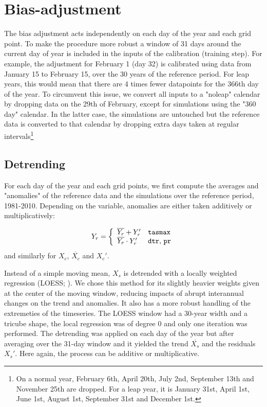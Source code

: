 \documentclass[letterpaper,10pt]{article}
\begin{document}
\section{Bias-adjustment}
The bias adjustment acts independently on each day of the year and each grid point.
To make the procedure more robust a window of 31 days around the current day of year is included in the inputs of the calibration (training step).
For example, the adjustment for February 1 (day 32) is calibrated using data from January 15 to February 15, over the 30 years of the reference period. 
For leap years, this would mean that there are 4 times fewer datapoints for the 366th day of the year.
To circumvent this issue, we convert all inputs to a "noleap" calendar by dropping data on the 29th of February, except for simulations using the "360 day" calendar.
In the latter case, the simulations are untouched but the reference data is converted to that calendar by dropping extra days taken at regular intervals\footnote{On a normal year, February 6th, April 20th, July 2nd, September 13th and November 25th are dropped. For a leap year, it is January 31st, April 1st, June 1st, August 1st, September 31st and December 1st.}

\subsection{Detrending}
For each day of the year and each grid points, we first compute the averages and "anomalies" of the reference data and the simulations over the reference period, 1981-2010. Depending on the variable, anomalies are either taken additively or multiplicatively:

\begin{align}
Y_r = \left\{ \begin{array}{ll} \overline{Y_r} + Y_r' & \text{\texttt{tasmax}} \\ \overline{Y_r}\cdot Y_r' & \text{\texttt{dtr}, \texttt{pr}} \end{array}\right.
\end{align}
and similarly for $X_c$, $\overline{X_c}$ and $X_c'$.

Instead of a simple moving mean, $X_s$ is detrended with a locally weighted regression (LOESS; \cite{Cleveland79}).
We chose this method for its slightly heavier weights given at the center of the moving window, reducing impacts of abrupt interannual changes on the trend and anomalies. It also has a more robust handling of the extremeties of the timeseries.
The LOESS window had a 30-year width and a tricube shape, the local regression was of degree 0 and only one iteration was performed.
The detrending was applied on each day of the year but after averaging over the 31-day window and it yielded the trend $\overline{X_s}$ and the residuals $X_s'$.
Here again, the process can be additive or multiplicative.
\end{document}
